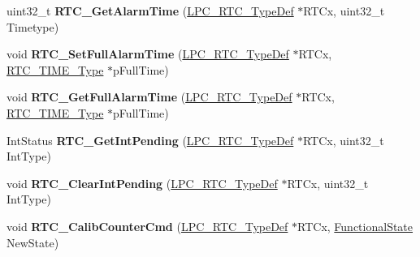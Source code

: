 \begin{DoxyCompactItemize}
\item 
\hypertarget{group___r_t_c___public___functions_gad5f0f65fc0e6508fd71e68cbdb94208a}{uint32\-\_\-t {\bfseries \-R\-T\-C\-\_\-\-Get\-Alarm\-Time} (\hyperlink{struct_l_p_c___r_t_c___type_def}{\-L\-P\-C\-\_\-\-R\-T\-C\-\_\-\-Type\-Def} $\ast$\-R\-T\-Cx, uint32\-\_\-t \-Timetype)}\label{group___r_t_c___public___functions_gad5f0f65fc0e6508fd71e68cbdb94208a}

\item 
\hypertarget{group___r_t_c___public___functions_ga484f34f2513abc1194d72609340d222a}{void {\bfseries \-R\-T\-C\-\_\-\-Set\-Full\-Alarm\-Time} (\hyperlink{struct_l_p_c___r_t_c___type_def}{\-L\-P\-C\-\_\-\-R\-T\-C\-\_\-\-Type\-Def} $\ast$\-R\-T\-Cx, \hyperlink{struct_r_t_c___t_i_m_e___type}{\-R\-T\-C\-\_\-\-T\-I\-M\-E\-\_\-\-Type} $\ast$p\-Full\-Time)}\label{group___r_t_c___public___functions_ga484f34f2513abc1194d72609340d222a}

\item 
\hypertarget{group___r_t_c___public___functions_gaf99c8f15e5bfcfe960245fe31404281f}{void {\bfseries \-R\-T\-C\-\_\-\-Get\-Full\-Alarm\-Time} (\hyperlink{struct_l_p_c___r_t_c___type_def}{\-L\-P\-C\-\_\-\-R\-T\-C\-\_\-\-Type\-Def} $\ast$\-R\-T\-Cx, \hyperlink{struct_r_t_c___t_i_m_e___type}{\-R\-T\-C\-\_\-\-T\-I\-M\-E\-\_\-\-Type} $\ast$p\-Full\-Time)}\label{group___r_t_c___public___functions_gaf99c8f15e5bfcfe960245fe31404281f}

\item 
\hypertarget{group___r_t_c___public___functions_ga8f4f59e503ca1f91f8adf05d76151a54}{\-Int\-Status {\bfseries \-R\-T\-C\-\_\-\-Get\-Int\-Pending} (\hyperlink{struct_l_p_c___r_t_c___type_def}{\-L\-P\-C\-\_\-\-R\-T\-C\-\_\-\-Type\-Def} $\ast$\-R\-T\-Cx, uint32\-\_\-t \-Int\-Type)}\label{group___r_t_c___public___functions_ga8f4f59e503ca1f91f8adf05d76151a54}

\item 
\hypertarget{group___r_t_c___public___functions_ga67d825769e3a391a1c9b2eeedac4f4e4}{void {\bfseries \-R\-T\-C\-\_\-\-Clear\-Int\-Pending} (\hyperlink{struct_l_p_c___r_t_c___type_def}{\-L\-P\-C\-\_\-\-R\-T\-C\-\_\-\-Type\-Def} $\ast$\-R\-T\-Cx, uint32\-\_\-t \-Int\-Type)}\label{group___r_t_c___public___functions_ga67d825769e3a391a1c9b2eeedac4f4e4}

\item 
\hypertarget{group___r_t_c___public___functions_ga608ed12738a529bc64213de593a10c5d}{void {\bfseries \-R\-T\-C\-\_\-\-Calib\-Counter\-Cmd} (\hyperlink{struct_l_p_c___r_t_c___type_def}{\-L\-P\-C\-\_\-\-R\-T\-C\-\_\-\-Type\-Def} $\ast$\-R\-T\-Cx, \hyperlink{group___l_p_c___types___public___types_gac9a7e9a35d2513ec15c3b537aaa4fba1}{\-Functional\-State} \-New\-State)}\label{group___r_t_c___public___functions_ga608ed12738a529bc64213de593a10c5d}


\end{DoxyCompactItemize}
